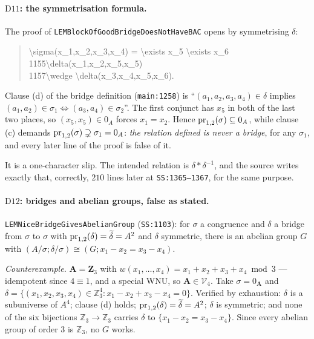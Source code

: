\paragraph{$\mathrm D{11}$: the symmetrisation formula.}
The proof of \texttt{LEMBlockOf\brk GoodBridge\brk DoesNotHaveBAC} opens by symmetrising $\delta$:
\begin{quote}\footnotesize{}\quad \textbackslash sigma(x\_1,x\_2,x\_3,x\_4) = \textbackslash exists x\_5 \textbackslash exists x\_6\\
1155\quad \textbackslash delta(x\_1,x\_2,x\_5,x\_5)\\
1157\quad \textbackslash wedge \textbackslash delta(x\_3,x\_4,x\_5,x\_6).
\end{quote}
Clause (d) of the bridge definition (\texttt{main:1258}) is
``$(a_{1},a_{2},a_{3},a_{4})\in\delta$ implies
$(a_{1},a_{2})\in\sigma_{1}\iff(a_{3},a_{4})\in\sigma_{2}$''. The first
conjunct has $x_{5}$ in both of the last two places, so $(x_{5},x_{5})\in 0_{A}$
forces $x_{1}=x_{2}$. Hence $\operatorname*{pr}_{1,2}(\sigma)\subseteq 0_{A}$, while clause
(c) demands $\operatorname*{pr}_{1,2}(\sigma)\supsetneq\sigma_{1}=0_{A}$: \emph{the relation
defined is never a bridge}, for any $\sigma_{1}$, and every later line of the
proof is false of it.

It is a one-character slip. The intended relation is $\delta\ast\delta^{-1}$,
and the source writes exactly that, correctly, $210$ lines later at
\texttt{SS:1365--1367}, for the same purpose.

\paragraph{$\mathrm D{12}$: bridges and abelian groups, false as stated.}
\texttt{LEMNiceBridgeGivesAbelianGroup} (\texttt{SS:1103}): for $\sigma$ a
congruence and $\delta$ a bridge from $\sigma$ to $\sigma$ with
$\operatorname*{pr}_{1,2}(\delta)=\widetilde{\delta}=A^{2}$ and $\delta$ symmetric, there is an
abelian group $G$ with $(A/\sigma;\delta/\sigma)\cong(G;x_{1}-x_{2}=x_{3}-x_{4})$.

\emph{Counterexample.} $\mathbf A=\mathbf Z_{3}$ with
$w(x_{1},\dots,x_{4})=x_{1}+x_{2}+x_{3}+x_{4}\bmod 3$ --- idempotent since
$4\equiv 1$, and a special WNU, so $\mathbf A\in\mathcal V_{4}$. Take
$\sigma=0_{\mathbf A}$ and
$\delta=\{(x_{1},x_{2},x_{3},x_{4})\in\mathbb Z_{3}^{4}:
x_{1}-x_{2}+x_{3}-x_{4}=0\}$. Verified by exhaustion: $\delta$ is a subuniverse
of $A^{4}$; clause (d) holds; $\operatorname*{pr}_{1,2}(\delta)=\widetilde{\delta}=A^{2}$; $\delta$
is symmetric; and none of the six bijections $\mathbb Z_{3}\to\mathbb Z_{3}$
carries $\delta$ to $\{x_{1}-x_{2}=x_{3}-x_{4}\}$. Since every abelian group of
order $3$ is $\mathbb Z_{3}$, no $G$ works.

